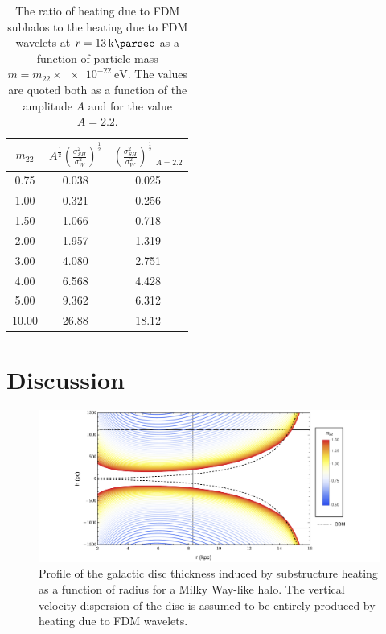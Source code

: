 \documentclass[usenatbib]{mnras}
\begin{document}
\begin{table} \label{FDM_ratio}
\begin{center}
 \begin{tabular}{||c c c||} 
 \hline
 $m_{22}$ & $A^{\tfrac{1}{2}} \left( \frac{\sigma_{SH}^2}{\sigma_{W}^2} \right)^{\tfrac{1}{2}}$ & $ \left( \frac{\sigma_{SH}^2}{\sigma_{W}^2} \right)^{\tfrac{1}{2}} \bigg|_{A = 2.2}$ \\ [2.5ex] 
 \hline\hline
 0.75 & 0.038 & 0.025 \\ 
 \hline
 1.00 & 0.321 &  0.256 \\
 \hline
 1.50 & 1.066 &  0.718 \\
 \hline
 2.00 & 1.957 &  1.319 \\
 \hline
 3.00 & 4.080 & 2.751 \\
 \hline
 4.00 & 6.568 & 4.428 \\
 \hline
 5.00 & 9.362 &  6.312 \\
 \hline
 10.00 & 26.88 & 18.12 \\ [1ex] 
 \hline
\end{tabular}
\end{center}
\caption{The ratio of heating due to FDM subhalos to the heating due to FDM wavelets at $r = \SI{13}{\kilo\parsec}$ as a function of particle mass $m = m_{22} \times \SI{e-22}{\electronvolt}$. The values are quoted both as a function of the amplitude $A$ and for the value $A = 2.2$. }
\end{table}

\section{Discussion}

\begin{figure}
\includegraphics[width=18cm]{disk_shape}
\vspace*{-5mm}
\caption{Profile of the galactic disc thickness induced by substructure heating as a function of radius for a Milky Way-like halo. The vertical velocity dispersion of the disc is assumed to be entirely produced by heating due to FDM wavelets. }
\label{fig:disc_shape_FDM}
\end{figure}
\end{document}
